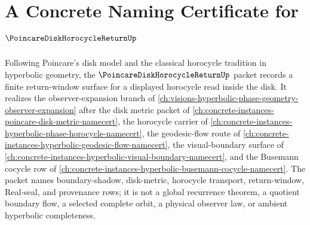 \chapter{A Concrete Naming Certificate for $\PoincareDiskHorocycleReturnUp$}
\label{ch:concrete-instances-poincare-disk-horocycle-return-namecert}

Following Poincare's disk model and the classical horocycle tradition in hyperbolic geometry, the $\PoincareDiskHorocycleReturnUp$ packet records a finite return-window surface for a displayed horocycle read inside the disk. It realizes the observer-expansion branch of \autoref{ch:visions-hyperbolic-phase-geometry-observer-expansion} after the disk metric packet of \autoref{ch:concrete-instances-poincare-disk-metric-namecert}, the horocycle carrier of \autoref{ch:concrete-instances-hyperbolic-phase-horocycle-namecert}, the geodesic-flow route of \autoref{ch:concrete-instances-hyperbolic-geodesic-flow-namecert}, the visual-boundary surface of \autoref{ch:concrete-instances-hyperbolic-visual-boundary-namecert}, and the Busemann cocycle row of \autoref{ch:concrete-instances-hyperbolic-busemann-cocycle-namecert}. The packet names boundary-shadow, disk-metric, horocycle transport, return-window, Real-seal, and provenance rows; it is not a global recurrence theorem, a quotient boundary flow, a selected complete orbit, a physical observer law, or ambient hyperbolic completeness.

